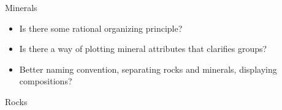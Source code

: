 \documentclass[12pt]{PalisadesLakesBook}
\begin{document}
\begin{plSection}{Minerals}
  \begin{itemize}
    \item Is there some rational organizing principle?
    \item Is there a way of plotting mineral attributes that clarifies groups?
    \item Better naming convention, separating rocks and minerals, displaying compositions?
  \end{itemize}

\end{plSection}%
\begin{plSection}{Rocks}
\end{plSection}%
%
\end{document}
